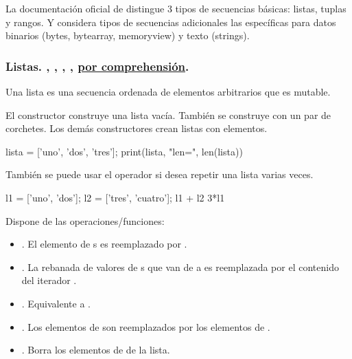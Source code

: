 \begin{note}
La documentación oficial de  distingue 3 tipos de secuencias básicas: listas, tuplas y rangos. Y considera tipos de secuencias adicionales las específicas para datos binarios (bytes, bytearray, memoryview) y texto (strings). 
\end{note}






\subsubsection*{Listas.  \cm{[]},  \cm{[x, y, ...]}, , , \underline{por comprehensión}.} \label{sec:listas} 

Una lista es una secuencia ordenada de elementos arbitrarios que es mutable. 

El constructor  construye una lista vacía. También se construye con un par de corchetes.
Los demás constructores crean listas con elementos.

\begin{example}{}
\begin{pyconsole}[][frame=single]
lista = ['uno', 'dos', 'tres']; 
print(lista, "len=", len(lista))
\end{pyconsole}
\end{example}

También se puede usar el operador \cm{*} si desea repetir una lista varias veces.

\begin{pyconsole}[][frame=single]
l1 = ['uno', 'dos'];
l2 = ['tres', 'cuatro'];
l1 + l2
3*l1
\end{pyconsole}

Dispone de las operaciones/funciones:
\begin{itemize}
\item {}. El elemento  de s es reemplazado por .
\item {}. La rebanada de valores de s que van de  a  es reemplazada por el contenido del iterador .
\item {}. Equivalente a .
\item {}. Los elementos de  son reemplazados por los elementos de .
\item {}. Borra los elementos de  de la lista.
\end{itemize}

